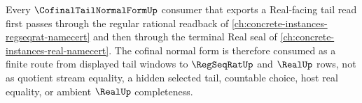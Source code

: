 \begin{lemma}
\label{lem:cofinal-tail-normal-form-regseqrat-real-dependency-route}
Every $\CofinalTailNormalFormUp$ consumer that exports a Real-facing tail read first passes through the regular rational readback of \autoref{ch:concrete-instances-regseqrat-namecert} and then through the terminal Real seal of \autoref{ch:concrete-instances-real-namecert}. The cofinal normal form is therefore consumed as a finite route from displayed tail windows to $\RegSeqRatUp$ and $\RealUp$ rows, not as quotient stream equality, a hidden selected tail, countable choice, host real equality, or ambient $\RealUp$ completeness.
\end{lemma}
